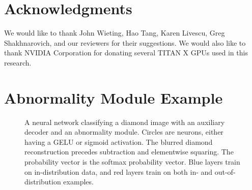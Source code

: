 \documentclass{article}
\begin{document}
\section*{Acknowledgments}
We would like to thank John Wieting, Hao Tang, Karen Livescu, Greg Shakhnarovich, and our reviewers for their suggestions. We would also like to thank NVIDIA Corporation for donating several TITAN X GPUs used in this research.


















































































\newpage
\appendix
\section{Abnormality Module Example}
\begin{figure}[H]
	\centering
	\noindent{}
	\caption{A neural network classifying a diamond image with an auxiliary decoder and an abnormality module. Circles are neurons, either having a GELU or sigmoid activation. The blurred diamond reconstruction precedes subtraction and elementwise squaring. The probability vector is the softmax probability vector. Blue layers train on in-distribution data, and red layers train on both in- and out-of-distribution examples.}\label{fig:decoder}
\end{figure}
\end{document}
